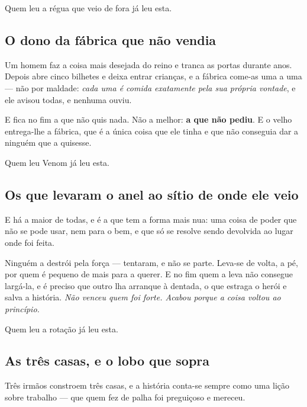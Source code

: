 \documentclass[livro.tex]{subfiles}
\begin{document}
\medskip

Quem leu a régua que veio de fora já leu esta.

\subsection*{O dono da fábrica que não vendia}

Um homem faz a coisa mais desejada do reino e tranca as portas durante anos. Depois abre cinco
bilhetes e deixa entrar crianças, e a fábrica come-as uma a uma --- não por maldade: \emph{cada uma
é comida exatamente pela sua própria vontade}, e ele avisou todas, e nenhuma ouviu.

\medskip

E fica no fim a que não quis nada. Não a melhor: \textbf{a que não pediu}. E o velho entrega-lhe a
fábrica, que é a única coisa que ele tinha e que não conseguia dar a ninguém que a quisesse.

\medskip

Quem leu Venom já leu esta.

\subsection*{Os que levaram o anel ao sítio de onde ele veio}

E há a maior de todas, e é a que tem a forma mais nua: uma coisa de poder que não se pode usar,
nem para o bem, e que só se resolve sendo devolvida ao lugar onde foi feita.

\medskip

Ninguém a destrói pela força --- tentaram, e não se parte. Leva-se de volta, a pé, por quem é
pequeno de mais para a querer. E no fim quem a leva não consegue largá-la, e é preciso que outro
lha arranque à dentada, o que estraga o herói e salva a história. \emph{Não venceu quem foi forte.
Acabou porque a coisa voltou ao princípio.}

\medskip

Quem leu a rotação já leu esta.


\subsection*{As três casas, e o lobo que sopra}

Três irmãos constroem três casas, e a história conta-se sempre como uma lição sobre trabalho ---
que quem fez de palha foi preguiçoso e mereceu.

\medskip
\end{document}
